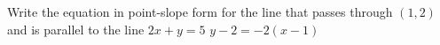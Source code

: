 {Write the equation in point-slope form for the line that passes through $(1,2)$ and is parallel to the line $2x+y=5$}
{$y-2=-2(x-1)$}
